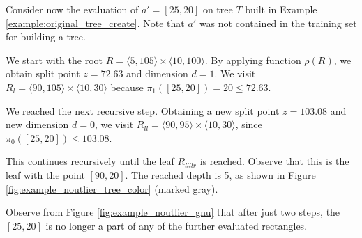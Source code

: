 \begin{example}
\label{ex:novelty_point_evaluation_original}
    Consider now the evaluation of $a' = [25,20]$ on tree $T$ built in Example \ref{example:original_tree_create}. Note that $a'$ was not contained in the training set for building a tree.

    We start with the root $R = \langle 5,105\rangle \times \langle 10, 100 \rangle$.
    By applying function $\rho(R)$, we obtain split point $z = 72.63$ and dimension $d = 1$.
We visit $R_l = \langle 90,105\rangle \times \langle 10, 30 \rangle$ 
because $\pi_1([25,20]) = 20 \le 72.63.$

We reached the next recursive step. Obtaining a new split point $z = 103.08$ and new dimension $d = 0$, we visit $R_{ll} = \langle 90,95\rangle \times \langle 10, 30 \rangle$, since $\pi_0([25,20]) \le 103.08$.


This continues recursively until the leaf $R_{llllr}$ is reached. Observe that this is the leaf with the point $[90,20]$. The reached depth is 5, as shown in Figure \ref{fig:example_noutlier_tree_color} (marked gray).


Observe from Figure \ref{fig:example_noutlier_gnu} that after just two steps, the $[25,20]$ is no longer a part of any of the further evaluated rectangles.


\end{example}


